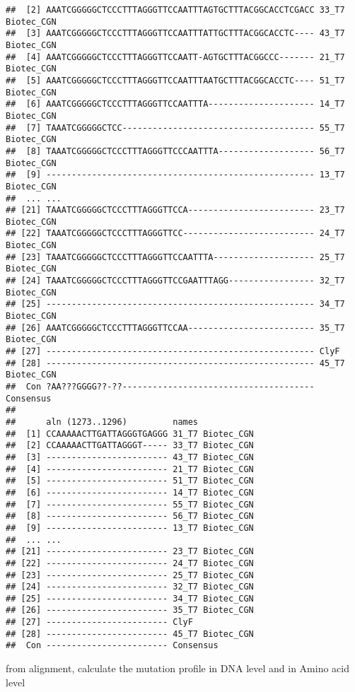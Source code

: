 \documentclass[
]{article}
\begin{document}
\begin{verbatim}
##  [2] AAATCGGGGGCTCCCTTTAGGGTTCCAATTTAGTGCTTTACGGCACCTCGACC 33_T7 Biotec_CGN
##  [3] AAATCGGGGGCTCCCTTTAGGGTTCCAATTTATTGCTTTACGGCACCTC---- 43_T7 Biotec_CGN
##  [4] AAATCGGGGGCTCCCTTTAGGGTTCCAATT-AGTGCTTTACGGCCC------- 21_T7 Biotec_CGN
##  [5] AAATCGGGGGCTCCCTTTAGGGTTCCAATTTAATGCTTTACGGCACCTC---- 51_T7 Biotec_CGN
##  [6] AAATCGGGGGCTCCCTTTAGGGTTCCAATTTA--------------------- 14_T7 Biotec_CGN
##  [7] TAAATCGGGGGCTCC-------------------------------------- 55_T7 Biotec_CGN
##  [8] TAAATCGGGGGCTCCCTTTAGGGTTCCCAATTTA------------------- 56_T7 Biotec_CGN
##  [9] ----------------------------------------------------- 13_T7 Biotec_CGN 
##  ... ...
## [21] TAAATCGGGGGCTCCCTTTAGGGTTCCA------------------------- 23_T7 Biotec_CGN
## [22] TAAATCGGGGGCTCCCTTTAGGGTTCC-------------------------- 24_T7 Biotec_CGN
## [23] TAAATCGGGGGCTCCCTTTAGGGTTCCAATTTA-------------------- 25_T7 Biotec_CGN
## [24] TAAATCGGGGGCTCCCTTTAGGGTTCCGAATTTAGG----------------- 32_T7 Biotec_CGN
## [25] ----------------------------------------------------- 34_T7 Biotec_CGN
## [26] AAATCGGGGGCTCCCTTTAGGGTTCCAA------------------------- 35_T7 Biotec_CGN
## [27] ----------------------------------------------------- ClyF
## [28] ----------------------------------------------------- 45_T7 Biotec_CGN
##  Con ?AA???GGGG??-??-------------------------------------- Consensus 
## 
##      aln (1273..1296)         names
##  [1] CCAAAAACTTGATTAGGGTGAGGG 31_T7 Biotec_CGN
##  [2] CCAAAAACTTGATTAGGGT----- 33_T7 Biotec_CGN
##  [3] ------------------------ 43_T7 Biotec_CGN
##  [4] ------------------------ 21_T7 Biotec_CGN
##  [5] ------------------------ 51_T7 Biotec_CGN
##  [6] ------------------------ 14_T7 Biotec_CGN
##  [7] ------------------------ 55_T7 Biotec_CGN
##  [8] ------------------------ 56_T7 Biotec_CGN
##  [9] ------------------------ 13_T7 Biotec_CGN 
##  ... ...
## [21] ------------------------ 23_T7 Biotec_CGN
## [22] ------------------------ 24_T7 Biotec_CGN
## [23] ------------------------ 25_T7 Biotec_CGN
## [24] ------------------------ 32_T7 Biotec_CGN
## [25] ------------------------ 34_T7 Biotec_CGN
## [26] ------------------------ 35_T7 Biotec_CGN
## [27] ------------------------ ClyF
## [28] ------------------------ 45_T7 Biotec_CGN
##  Con ------------------------ Consensus
\end{verbatim}

from alignment, calculate the mutation profile in DNA level and in Amino
acid level
\end{document}
